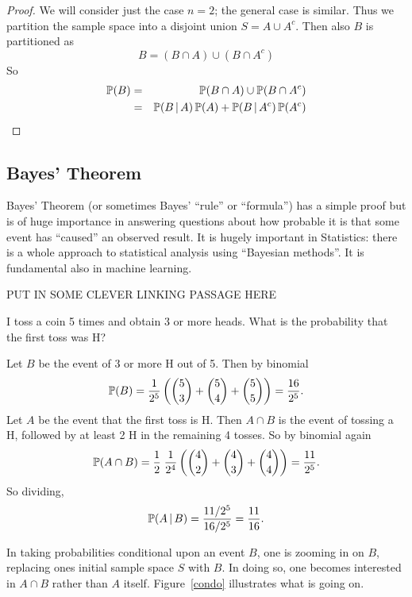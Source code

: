 \begin{proof}
We will consider just the case $n=2$; the general case is similar. Thus we partition the sample space into a disjoint union $S = A \cup A^c$.  Then also $B$ is partitioned as 
 \[
    B = ( B \cap A ) \cup (B \cap A^c) 
 \]
So 
 \begin{eqnarray*}
    {\mathbb P}(B) & =& {\mathbb P}( B \cap A ) \cup {\mathbb P} (B \cap A^c) \\ 
     &=& {\mathbb P}(B \, | \, A) \, {\mathbb P}(A) + {\mathbb P}(B \, | \, A^c) \, {\mathbb P}(A^c)
 \end{eqnarray*} 
\end{proof}
\subsection{Bayes' Theorem} 

Bayes' Theorem (or sometimes Bayes' ``rule'' or ``formula'') has a simple proof but is of huge importance in  answering questions about how probable it is that some event has ``caused'' an observed result.  It is hugely important in Statistics: there is a whole approach to statistical analysis using ``Bayesian methods''.  It is fundamental also in machine learning. 

\begin{center}
    PUT IN SOME CLEVER LINKING PASSAGE HERE
\end{center}
I toss a coin 5 times and obtain 3 or more heads.  What is the probability that the first toss was H? 

Let $B$ be the event of 3 or more H out of 5.  Then by binomial 
 \[
     {\mathbb P}( B) = \frac1{2^5}\left(  \binom53 + \binom54 + \binom55 \right)   =  \frac{16}{2^5}.
 \]
Let $A$ be the event that the first toss is H.  Then $A \cap B$ is the event of tossing a H, followed by at least 2 H in the remaining 4 tosses. So by binomial again 
 \[
   {\mathbb P}(A \cap B) = \frac12 \; \frac1{2^4} \left(  \binom42 + \binom43 +\binom 44\right) = \frac{11}{2^5}.
 \]
 So dividing, 
  \[
  {\mathbb P}(A \, | \, B) = \frac{11/2^5}{16/2^5} = \frac{11}{16}.  
 \]

In taking probabilities conditional upon an event $B$, one is zooming in on $B$, replacing ones initial sample space $S$ with $B$. In doing so, one becomes interested in $A \cap B$ rather than $A$ itself.  Figure~\ref{condo} illustrates what is going on. 

